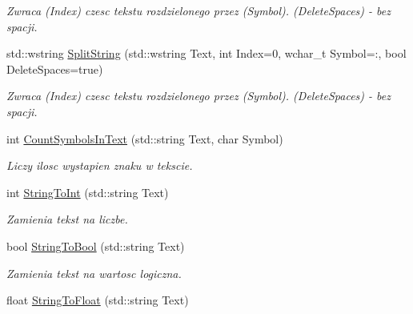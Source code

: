 \begin{DoxyCompactItemize}
\begin{DoxyCompactList}\small\item\em Zwraca (Index) czesc tekstu rozdzielonego przez (Symbol). (Delete\+Spaces) -\/ bez spacji. \end{DoxyCompactList}\item 
\mbox{\label{namespacetfp_af6353d7e02382f39ba26a052352f5dce}} 
std\+::wstring \mbox{\hyperlink{namespacetfp_af6353d7e02382f39ba26a052352f5dce}{Split\+String}} (std\+::wstring Text, int Index=0, wchar\+\_\+t Symbol=\textquotesingle{}\+:\textquotesingle{}, bool Delete\+Spaces=true)
\begin{DoxyCompactList}\small\item\em Zwraca (Index) czesc tekstu rozdzielonego przez (Symbol). (Delete\+Spaces) -\/ bez spacji. \end{DoxyCompactList}\item 
\mbox{\label{namespacetfp_a409a47f2671919ba24c3ef50093d319d}} 
int \mbox{\hyperlink{namespacetfp_a409a47f2671919ba24c3ef50093d319d}{Count\+Symbols\+In\+Text}} (std\+::string Text, char Symbol)
\begin{DoxyCompactList}\small\item\em Liczy ilosc wystapien znaku w tekscie. \end{DoxyCompactList}\item 
\mbox{\label{namespacetfp_a4a9bca3c9918632353b2fd0352905ab5}} 
int \mbox{\hyperlink{namespacetfp_a4a9bca3c9918632353b2fd0352905ab5}{String\+To\+Int}} (std\+::string Text)
\begin{DoxyCompactList}\small\item\em Zamienia tekst na liczbe. \end{DoxyCompactList}\item 
\mbox{\label{namespacetfp_a420b66c3cd495c5fd989453612d6c9e7}} 
bool \mbox{\hyperlink{namespacetfp_a420b66c3cd495c5fd989453612d6c9e7}{String\+To\+Bool}} (std\+::string Text)
\begin{DoxyCompactList}\small\item\em Zamienia tekst na wartosc logiczna. \end{DoxyCompactList}\item 
\mbox{\label{namespacetfp_abc839272dd008084fd2daa83b491c172}} 
float \mbox{\hyperlink{namespacetfp_abc839272dd008084fd2daa83b491c172}{String\+To\+Float}} (std\+::string Text)

\end{DoxyCompactItemize}
